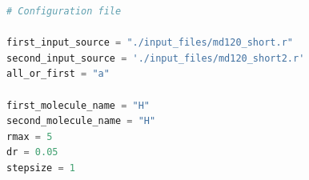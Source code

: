 \begin{lstlisting}[language=Python, caption=Config file for setting parameters during the run.]
# Configuration file

first_input_source = "./input_files/md120_short.r"
second_input_source = './input_files/md120_short2.r'
all_or_first = "a"

first_molecule_name = "H"
second_molecule_name = "H"
rmax = 5
dr = 0.05
stepsize = 1
\end{lstlisting}


